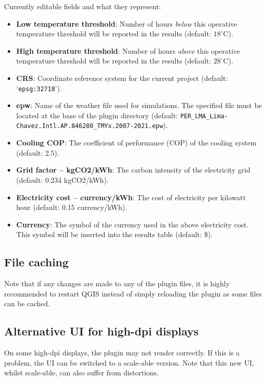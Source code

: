 \documentclass{article}
\begin{document}
Currently editable fields and what they represent:
\begin{itemize}
    \item \textbf{Low temperature threshold}: Number of hours \textit{below} this operative temperature threshold will be reported in the results (default: $18^{\circ}$C).
    \item \textbf{High temperature threshold}: Number of hours \textit{above} this operative temperature threshold will be reported in the results (default: $28^{\circ}$C).
    \item \textbf{CRS}: Coordinate reference system for the current project (default: `\texttt{epsg:32718}').
    \item \textbf{epw}: Name of the weather file used for simulations. The specified file must be located at the base of the plugin directory (default: \texttt{PER\_LMA\_Lima-Chavez.Intl.AP.846280\_TMYx.2007-2021.epw}).
    \item \textbf{Cooling COP}: The coefficient of performance (COP) of the cooling system (default: 2.5).
    \item \textbf{Grid factor -- kgCO2/kWh}: The carbon intensity of the electricity grid (default: 0.234 kgCO2/kWh).
    \item \textbf{Electricity cost -- currency/kWh}: The cost of electricity per kilowatt hour (default: 0.15 currency/kWh).
    \item \textbf{Currency}: The symbol of the currency used in the above electricity cost. This symbol will be inserted into the results table (default: \$).
\end{itemize}

\subsection{File caching}
Note that if any changes are made to any of the plugin files, it is highly recommended to restart QGIS instead of simply reloading the plugin as some files can be cached.

\subsection{Alternative UI for high-dpi displays}
On some high-dpi displays, the plugin may not render correctly. If this is a problem, the UI can be switched to a scale-able version. Note that this new UI, whilst scale-able, can also suffer from distortions. \\
\end{document}
